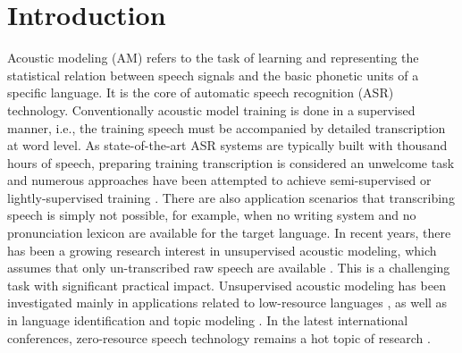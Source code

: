 \documentclass[a4paper]{article}
\begin{document}
\section{Introduction}
Acoustic modeling (AM) refers to the task of learning and representing the statistical relation between speech signals and the basic phonetic units of a specific language. It is the core of automatic speech recognition (ASR) technology. Conventionally acoustic model training is done in a supervised manner, i.e., the training speech must be accompanied by detailed transcription at word level. As state-of-the-art ASR systems are typically built with thousand hours of speech, preparing training transcription is considered an unwelcome task and numerous approaches have been attempted to achieve semi-supervised or lightly-supervised training \cite{lamel2002lightly,fraga2011lattice,yu2010active,huang2010semi}.
There are also application scenarios that transcribing speech is simply not possible, for example, when no writing system and no pronunciation lexicon are available for the target language.
In recent years, there has been a growing research interest in unsupervised acoustic modeling, which assumes that only un-transcribed raw speech are available \cite{glass2012towards,jansen2013weak,lee2012nonparametric,WangLeeLeungEtAl2014,feng2016exploit}.
This is a challenging task with significant practical impact. Unsupervised acoustic modeling has been investigated mainly in applications related to low-resource languages \cite{Wang2014}, as well as in language identification \cite{li2007vector} and topic modeling \cite{harwath2013zero}. In the latest international conferences, zero-resource speech technology remains a hot topic of research \cite{versteegh2015zero}.
\end{document}
